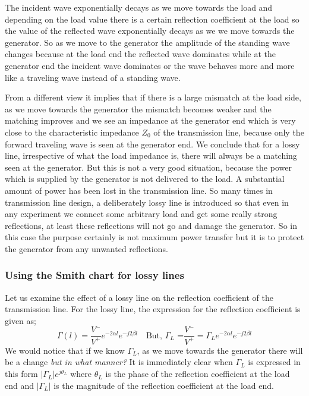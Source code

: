 The incident wave exponentially decays as we move towards the load and depending on the load value there is a certain reflection coefficient at the load so the value of the reflected wave exponentially decays as we we move towards the generator. So as we move to the generator the amplitude of the standing wave changes because at the load end the reflected wave dominates while at the generator end the incident wave dominates or the wave behaves more and more like a traveling wave instead of a standing wave.

From a different view it implies that if there is a large mismatch at the load side, as we move towards the generator the mismatch becomes weaker and the matching improves and we see an impedance at the generator end which is very close to the characteristic impedance $Z_0$ of the transmission line, because only the forward traveling wave is seen at the generator end. We conclude that for a lossy line, irrespective of what the load impedance is, there will always be a matching seen at the generator. But this is not a very good situation, because the power which is supplied by the generator is not delivered to the load. A substantial amount of power has been lost in the transmission line. So many times in transmission line design, a deliberately lossy line is introduced so that even in any experiment we connect some arbitrary load and get  some really strong reflections, at least these reflections will not go and damage the generator. So in this case the purpose certainly is not maximum power transfer but it is to protect the generator from any unwanted reflections.

\subsubsection{Using the Smith chart for lossy lines}
Let us examine the effect of a lossy line on the reflection coefficient of the transmission line. For the lossy line, the expression for the reflection coefficient is given as;
\begin{dmath*}
\Gamma{(l)} = \frac{V^-}{V^+}e^{-2\alpha l}e^{-j2\beta l}\quad\text{But, }\Gamma_L\text{ =}\frac{V^-}{V^+}
= \Gamma_Le^{-2\alpha l}e^{-j2\beta l}
\end{dmath*}
We would notice that if we know $\Gamma_L$, as we move towards the generator there will be a change \emph{but in what manner?} It is immediately clear when $\Gamma_L$ is expressed in this form $|\Gamma_L |e^{j\theta_L}$ where $\theta_L$ is the phase of the reflection coefficient at the load end and $|\Gamma_L|$ is the magnitude of the reflection coefficient at the load end.

